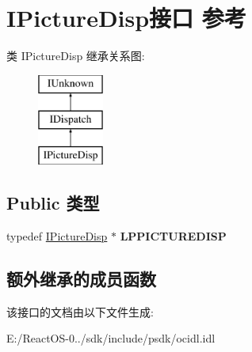 \hypertarget{interface_i_picture_disp}{}\section{I\+Picture\+Disp接口 参考}
\label{interface_i_picture_disp}
类 I\+Picture\+Disp 继承关系图\+:\begin{figure}[H]
\begin{center}
\leavevmode
\includegraphics[height=3.000000cm]{interface_i_picture_disp}
\end{center}
\end{figure}
\subsection*{Public 类型}
\begin{DoxyCompactItemize}
\item 
\mbox{\label{interface_i_picture_disp_a4a49155434d3d768dc8dd31fa0c06a51}} 
typedef \hyperlink{interface_i_picture_disp}{I\+Picture\+Disp} $\ast$ {\bfseries L\+P\+P\+I\+C\+T\+U\+R\+E\+D\+I\+SP}
\end{DoxyCompactItemize}
\subsection*{额外继承的成员函数}


该接口的文档由以下文件生成\+:\begin{DoxyCompactItemize}
\item 
E\+:/\+React\+O\+S-\/0../sdk/include/psdk/ocidl.\+idl\end{DoxyCompactItemize}

